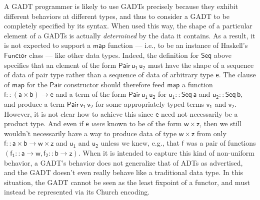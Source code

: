 \documentclass[acmsmall,screen,review,anonymous]{acmart}
\theoremstyle{definition}
\begin{document}
A GADT programmer is likely to use GADTs precisely because they
exhibit different behaviors at different types, and thus to consider a
GADT to be completely specified by its syntax. When used this way, the
shape of a particular element of a GADTs is actually {\em determined}
by the data it contains. As a result, it is not expected to support a
$\mathsf{map}$ function --- i.e., to be an instance of Haskell's
$\mathsf{Functor}$ class --- like other data types. Indeed, the
definition for $\mathsf{Seq}$ above specifies that an element of the
form $\mathsf{Pair\,u_1\,u_2}$ must have the shape of a sequence of
data of pair type rather than a sequence of data of arbitrary type
$\mathsf{e}$.  The clause of $\mathsf{map}$ for the $\mathsf{Pair}$
constructor should therefore feed $\mathsf{map}$ a function $\mathsf{f
  :: (a \times b) \to e}$ and a term of the form $\mathsf{Pair
  \,u_1\,u_2}$ for $\mathsf{u_1 :: Seq\,a}$ and $\mathsf{u_2 ::
  Seq\,b}$, and produce a term $\mathsf{Pair\,v_1\,v_2}$ for some
appropriately typed terms $\mathsf{v_1}$ and $\mathsf{v_2}$. However,
it is not clear how to achieve this since $\mathsf{e}$ need not
necessarily be a product type. And even if $\mathsf{e}$ {\em were}
known to be of the form $\mathsf{w \times z}$, then we still wouldn't
necessarily have a way to produce data of type $\mathsf{w \times z}$
from only $\mathsf{f :: a \times b \to w \times z}$ and $\mathsf{u_1}$
and $\mathsf{u_2}$ unless we knew, e.g., that $\mathsf{f}$ was a pair
of functions $\mathsf{(f_1 :: a \to w, f_2 :: b \to z)}$. When it is
intended to capture this kind of non-uniform behavior, a GADT's
behavior does not generalize that of ADTs as advertised, and the GADT
doesn't even really behave like a traditional data type. In this
situation, the GADT cannot be seen as the least fixpoint of a functor,
and must instead be represented via its Church encoding.
\end{document}
